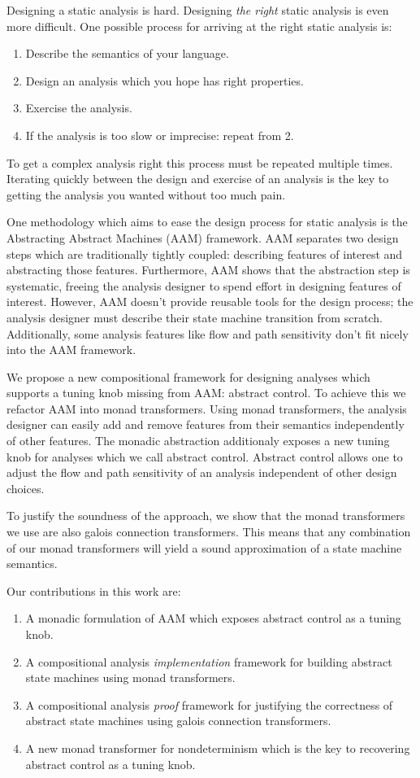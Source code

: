 \documentclass{article}
\begin{document}
Designing a static analysis is hard.
Designing \emph{the right} static analysis is even more difficult.
One possible process for arriving at the right static analysis is:
\begin{enumerate}
\item Describe the semantics of your language.
\item Design an analysis which you hope has right properties.
\item Exercise the analysis.
\item If the analysis is too slow or imprecise: repeat from 2.
\end{enumerate}
To get a complex analysis right this process must be repeated multiple times.
Iterating quickly between the design and exercise of an analysis is the key to getting the analysis you wanted without too much pain.

One methodology which aims to ease the design process for static analysis is the Abstracting Abstract Machines (AAM) framework\cite{AAM}.
AAM separates two design steps which are traditionally tightly coupled: describing features of interest and abstracting those features.
Furthermore, AAM shows that the abstraction step is systematic, freeing the analysis designer to spend effort in designing features of interest.
However, AAM doesn't provide reusable tools for the design process; the analysis designer must describe their state machine transition from scratch.
Additionally, some analysis features like flow and path sensitivity don't fit nicely into the AAM framework.

We propose a new compositional framework for designing analyses which supports a tuning knob missing from AAM: abstract control.
To achieve this we refactor AAM into monad transformers.
Using monad transformers, the analysis designer can easily add and remove features from their semantics independently of other features.
The monadic abstraction additionaly exposes a new tuning knob for analyses which we call abstract control.
Abstract control allows one to adjust the flow and path sensitivity of an analysis independent of other design choices.

To justify the soundness of the approach, we show that the monad transformers we use are also galois connection transformers.
This means that any combination of our monad transformers will yield a sound approximation of a state machine semantics.

Our contributions in this work are:
\begin{enumerate}
\item A monadic formulation of AAM which exposes abstract control as a tuning knob.
\item A compositional analysis \emph{implementation} framework for building abstract state machines using monad transformers.
\item A compositional analysis \emph{proof} framework for justifying the correctness of abstract state machines using galois connection transformers.
\item A new monad transformer for nondeterminism which is the key to recovering abstract control as a tuning knob.
\end{enumerate}
\end{document}
